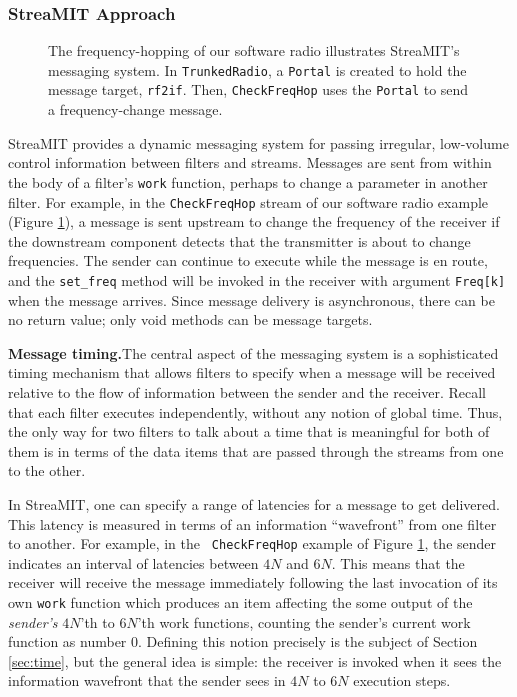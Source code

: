 \subsubsection{StreaMIT Approach}

\begin{figure}
\caption{The frequency-hopping of our software radio illustrates StreaMIT's messaging system.  In {\tt TrunkedRadio}, a {\tt Portal} is created to hold the message target, {\tt rf2if}.  Then, {\tt CheckFreqHop} uses the {\tt Portal} to send a frequency-change message.}
\vspace{-12pt}
\label{fig:portal-code}
\end{figure}

StreaMIT provides a dynamic messaging system for passing irregular,
low-volume control information between filters and streams.  Messages
are sent from within the body of a filter's {\tt work} function,
perhaps to change a parameter in another filter.  For example, in the
{\tt CheckFreqHop} stream of our software radio example (Figure
\ref{fig:portal-code}), a message is sent upstream to change the frequency of
the receiver if the downstream component detects that the transmitter
is about to change frequencies.  The sender can continue to execute
while the message is en route, and the {\tt set\_freq} method will be
invoked in the receiver with argument {\tt Freq[k]} when the message
arrives.  Since message delivery is asynchronous, there can be no
return value; only void methods can be message targets.

{\bf Message timing.}The central aspect of the messaging system is a
sophisticated timing mechanism that allows filters to specify when a
message will be received relative to the flow of information between
the sender and the receiver.  Recall that each filter executes
independently, without any notion of global time.  Thus, the only way
for two filters to talk about a time that is meaningful for both of
them is in terms of the data items that are passed through the streams
from one to the other.

In StreaMIT, one can specify a range of latencies for a message to get
delivered.  This latency is measured in terms of an information
``wavefront'' from one filter to another.  For example, in the {\tt
CheckFreqHop} example of Figure \ref{fig:portal-code}, the sender
indicates an interval of latencies between $4N$ and $6N$.  This means
that the receiver will receive the message immediately following the
last invocation of its own {\tt work} function which produces an item
affecting the some output of the {\it sender's} $4N$'th to $6N$'th
work functions, counting the sender's current work function as number
0.  Defining this notion precisely is the subject of Section
\ref{sec:time}, but the general idea is simple:  the receiver is
invoked when it sees the information wavefront that the sender sees in
$4N$ to $6N$ execution steps.  

